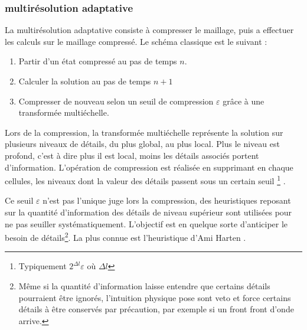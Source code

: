         \subsubsection{multirésolution adaptative}
            La multirésolution adaptative consiste à compresser le maillage, puis a effectuer les calculs sur le maillage compressé.
            Le schéma classique est le suivant : 
            \begin{enumerate}
                \item Partir d'un état compressé au pas de temps $n$.
                \item Calculer la solution au pas de temps $n+1$
                \item Compresser de nouveau selon un seuil de compression $\varepsilon$ grâce à une transformée multiéchelle.
            \end{enumerate}
            Lors de la compression, la transformée multiéchelle représente la solution sur plusieurs niveaux de détails, du plus global, au plus local.
            Plus le niveau est profond, c'est à dire plus il est local, moins les détails associés portent d'information. 
            L'opération de compression est réalisée en supprimant en chaque cellules, les niveaux dont la valeur des détails
            passent sous un certain seuil \footnote{Typiquement $2^{\Delta l} \varepsilon$ où ${\Delta l}$} \cite{postelApprox} .

            Ce seuil $\varepsilon$ n'est pas l'unique juge lors la compression, des heuristiques reposant sur la quantité d'information des détails de niveau supérieur
            sont utilisées pour ne pas seuiller systématiquement. L'objectif est en quelque sorte d'anticiper le besoin de détails\footnote{Même si la quantité d'information laisse entendre que 
            certains détails pourraient être ignorés, l'intuition physique pose sont veto et force certains détails à être conservés par précaution, par exemple si un front front d'onde arrive.}.
            La plus connue est l'heuristique d'Ami Harten \cite{harten1994}.

